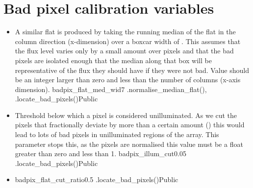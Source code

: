 \clearpage
\newpage
\section{Bad pixel calibration variables}
\label{ch:variables:badpix}

\begin{itemize}

	\item {} 
	{A similar flat is produced by taking the running median of the flat in the column direction (x-dimension) over a boxcar width of . This assumes that the flux level varies only by a small amount over  pixels and that the bad pixels are isolated enough that the median along that box will be representative of the flux they should have if they were not bad. Value should be an integer larger than zero and less than the number of columns (x-axis dimension).}
	{badpix\_flat\_med\_wid}{7}
	{\calbadpix}{\constantsfile}{\spirouImage.normalise\_median\_flat(), \spirouImage.locate\_bad\_pixels()}{Public}

	\item {}
	{Threshold below which a pixel is considered unilluminated. As we cut the pixels that fractionally deviate by more than a certain amount () this would lead to lots of bad pixels in unilluminated regions of the array. This parameter stops this, as the pixels are normalised this value must be a float greater than zero and less than 1.}
	{badpix\_illum\_cut}{0.05}
	{\calbadpix}{\constantsfile}{\spirouImage.locate\_bad\_pixels()}{Public}

	\item {} 
	{badpix\_flat\_cut\_ratio}{0.5}
	{\calbadpix}{\constantsfile}{\spirouImage.locate\_bad\_pixels()}{Public}


\end{itemize}
